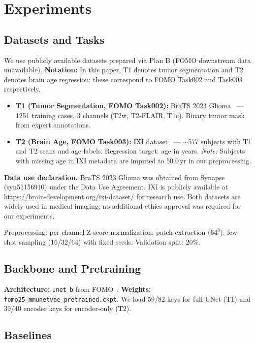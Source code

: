 \section{Experiments}
\label{sec:experiments}

\subsection{Datasets and Tasks}
\label{sec:data}

We use publicly available datasets prepared via Plan B (FOMO downstream data unavailable). \textbf{Notation:} In this paper, T1 denotes tumor segmentation and T2 denotes brain age regression; these correspond to FOMO Task002 and Task003 respectively.
\begin{itemize}
\item \textbf{T1 (Tumor Segmentation, FOMO Task002):} BraTS 2023 Glioma~\cite{brats2023} --- 1251 training cases, 3 channels (T2w, T2-FLAIR, T1c). Binary tumor mask from expert annotations.
\item \textbf{T2 (Brain Age, FOMO Task003):} IXI dataset~\cite{ixi} --- $\sim$577 subjects with T1 and T2 scans and age labels. Regression target: age in years. \emph{Note:} Subjects with missing age in IXI metadata are imputed to 50.0\,yr in our preprocessing.
\end{itemize}

\textbf{Data use declaration.} BraTS 2023 Glioma was obtained from Synapse (syn51156910) under the Data Use Agreement. IXI is publicly available at \url{https://brain-development.org/ixi-dataset/} for research use. Both datasets are widely used in medical imaging; no additional ethics approval was required for our experiments.

Preprocessing: per-channel Z-score normalization, patch extraction ($64^3$), few-shot sampling (16/32/64) with fixed seeds. Validation split: 20\%.

\subsection{Backbone and Pretraining}
\label{sec:backbone}

\textbf{Architecture:} \texttt{unet\_b} from FOMO~\cite{fomo2025}. \textbf{Weights:} \texttt{fomo25\_mmunetvae\_pretrained.ckpt}. We load 59/82 keys for full UNet (T1) and 39/40 encoder keys for encoder-only (T2).

\subsection{Baselines}
\label{sec:baselines}

